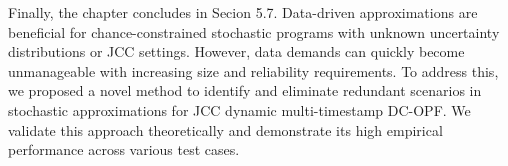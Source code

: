 


Finally, the chapter concludes in Secion 5.7. Data-driven approximations are beneficial for chance-constrained stochastic programs with unknown uncertainty distributions or JCC settings. However, data demands can quickly become unmanageable with increasing size and reliability requirements. To address this, we proposed a novel method to identify and eliminate redundant scenarios in stochastic approximations for JCC dynamic multi-timestamp DC-OPF. We validate this approach theoretically and demonstrate its high empirical performance across various test cases.

